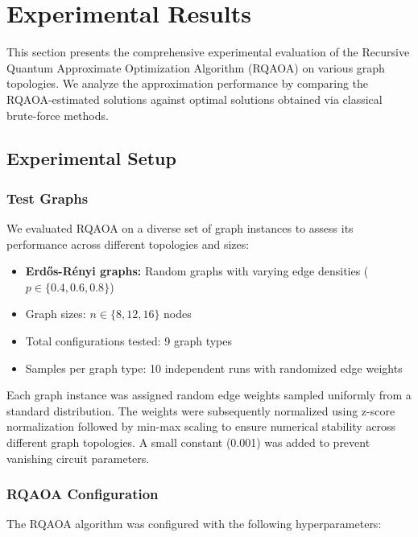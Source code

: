 
\section{Experimental Results}
\label{sec:results}

This section presents the comprehensive experimental evaluation of the Recursive Quantum Approximate Optimization Algorithm (RQAOA) on various graph topologies. We analyze the approximation performance by comparing the RQAOA-estimated solutions against optimal solutions obtained via classical brute-force methods.

\subsection{Experimental Setup}
\label{subsec:setup}

\subsubsection{Test Graphs}
We evaluated RQAOA on a diverse set of graph instances to assess its performance across different topologies and sizes:

\begin{itemize}
    \item \textbf{Erdős-Rényi graphs:} Random graphs with varying edge densities ($p \in \{0.4, 0.6, 0.8\}$)
    \item Graph sizes: $n \in \{8, 12, 16\}$ nodes
    \item Total configurations tested: 9 graph types
    \item Samples per graph type: 10 independent runs with randomized edge weights
\end{itemize}

Each graph instance was assigned random edge weights sampled uniformly from a standard distribution. The weights were subsequently normalized using z-score normalization followed by min-max scaling to ensure numerical stability across different graph topologies. A small constant (0.001) was added to prevent vanishing circuit parameters.

\subsubsection{RQAOA Configuration}
The RQAOA algorithm was configured with the following hyperparameters:

